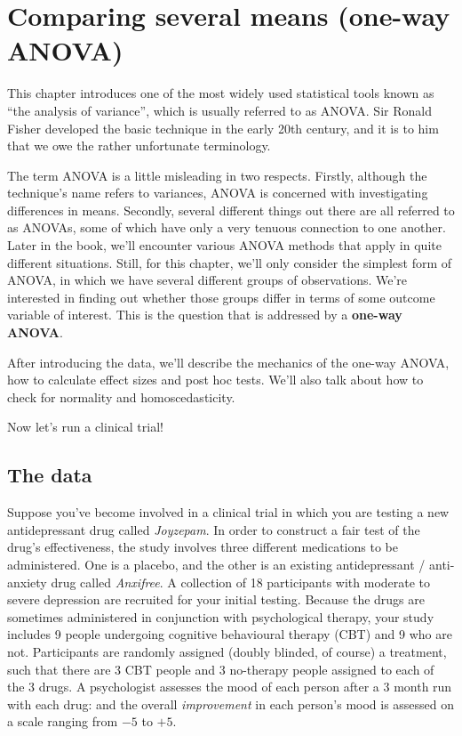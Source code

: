 \documentclass[
  11pt,
  a4paper,
  twoside,symmetric,openright]{book}
\theoremstyle{break}
\theoremstyle{break}
\begin{document}
\chapter{Comparing several means (one-way ANOVA)}\label{anova}

This chapter introduces one of the most widely used statistical tools known as ``the analysis of variance'', which is usually referred to as ANOVA. Sir Ronald Fisher developed the basic technique in the early 20th century, and it is to him that we owe the rather unfortunate terminology.

The term ANOVA is a little misleading in two respects. Firstly, although the technique's name refers to variances, ANOVA is concerned with investigating differences in means. Secondly, several different things out there are all referred to as ANOVAs, some of which have only a very tenuous connection to one another. Later in the book, we'll encounter various ANOVA methods that apply in quite different situations. Still, for this chapter, we'll only consider the simplest form of ANOVA, in which we have several different groups of observations. We're interested in finding out whether those groups differ in terms of some outcome variable of interest. This is the question that is addressed by a \textbf{one-way ANOVA}.

After introducing the data, we'll describe the mechanics of the one-way ANOVA, how to calculate effect sizes and post hoc tests. We'll also talk about how to check for normality and homoscedasticity.

Now let's run a clinical trial!

\section{The data}\label{the-data}

Suppose you've become involved in a clinical trial in which you are testing a new antidepressant drug called \emph{Joyzepam}. In order to construct a fair test of the drug's effectiveness, the study involves three different medications to be administered. One is a placebo, and the other is an existing antidepressant / anti-anxiety drug called \emph{Anxifree}. A collection of 18 participants with moderate to severe depression are recruited for your initial testing. Because the drugs are sometimes administered in conjunction with psychological therapy, your study includes 9 people undergoing cognitive behavioural therapy (CBT) and 9 who are not. Participants are randomly assigned (doubly blinded, of course) a treatment, such that there are 3 CBT people and 3 no-therapy people assigned to each of the 3 drugs. A psychologist assesses the mood of each person after a 3 month run with each drug: and the overall \emph{improvement} in each person's mood is assessed on a scale ranging from \(-5\) to \(+5\).
\end{document}
